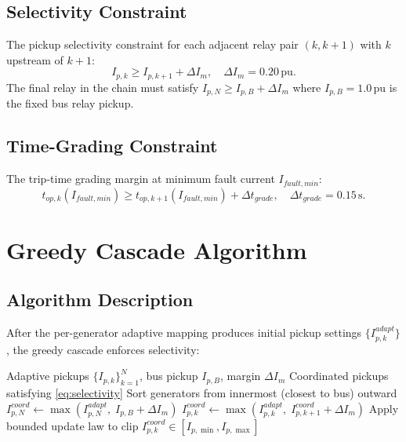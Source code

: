 \documentclass[12pt,a4paper]{article}
\theoremstyle{definition}
\theoremstyle{plain}
\begin{document}
\subsection{Selectivity Constraint}
\label{sec:problem:selectivity}

The pickup selectivity constraint for each adjacent relay pair $(k, k+1)$
with $k$ upstream of $k+1$:
\begin{equation}
  I_{p,k} \geq I_{p,k+1} + \Delta I_m, \quad \Delta I_m = 0.20\,\text{pu}.
  \label{eq:selectivity}
\end{equation}
The final relay in the chain must satisfy $I_{p,N} \geq I_{p,B} + \Delta I_m$
where $I_{p,B} = 1.0\,\text{pu}$ is the fixed bus relay pickup.

\subsection{Time-Grading Constraint}
\label{sec:problem:grading}

The trip-time grading margin at minimum fault current $I_{fault,min}$:
\begin{equation}
  t_{op,k}(I_{fault,min}) \geq t_{op,k+1}(I_{fault,min}) + \Delta t_{grade},
  \quad \Delta t_{grade} = 0.15\,\text{s}.
  \label{eq:grading}
\end{equation}

\section{Greedy Cascade Algorithm}
\label{sec:algorithm}

\subsection{Algorithm Description}
\label{sec:algorithm:desc}

After the per-generator adaptive mapping produces initial pickup settings
$\{I_{p,k}^{adapt}\}$, the greedy cascade enforces selectivity:

\begin{algorithm}[H]
\caption{Greedy cascade coordination}
\label{alg:cascade}
\begin{algorithmic}[1]
\Require Adaptive pickups $\{I_{p,k}\}_{k=1}^N$, bus pickup $I_{p,B}$,
         margin $\Delta I_m$
\Ensure Coordinated pickups satisfying \cref{eq:selectivity}
\State Sort generators from innermost (closest to bus) outward
\State $I_{p,N}^{coord} \leftarrow \max(I_{p,N}^{adapt},\; I_{p,B} + \Delta I_m)$
  \State $I_{p,k}^{coord} \leftarrow \max(I_{p,k}^{adapt},\;
         I_{p,k+1}^{coord} + \Delta I_m)$
\EndFor
\State Apply bounded update law to clip $I_{p,k}^{coord} \in [I_{p,\min}, I_{p,\max}]$
\end{algorithmic}
\end{algorithm}
\end{document}
